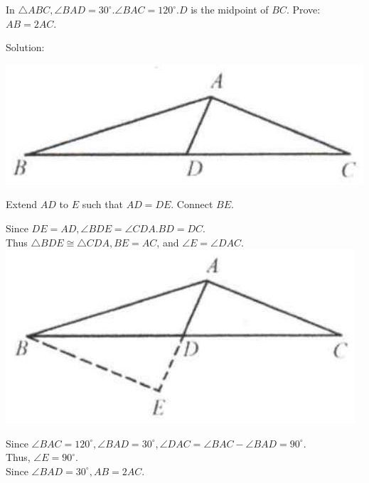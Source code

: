 \documentclass{article}
\begin{document}
In \(\triangle A B C, \angle B A D=30^{\circ} . \angle B A C=120^{\circ} . D\) is the midpoint of \(B C\). Prove: \(A B=2 A C\).

Solution:
\begin{center}
\includegraphics[width=\textwidth]{images/024(4).jpg}
\end{center}

Extend \(A D\) to \(E\) such that \(A D=D E\). Connect \(B E\).

Since \(D E=A D, \angle B D E=\angle C D A . B D=D C\).\\
Thus \(\triangle B D E \cong \triangle C D A, B E=A C\), and \(\angle E=\angle D A C\).\\
\centering
\includegraphics[width=\textwidth]{images/024.jpg}

Since \(\angle B A C=120^{\circ}, \angle B A D=30^{\circ}, \angle D A C=\angle B A C-\angle B A D=90^{\circ}\).\\
Thus, \(\angle E=90^{\circ}\).\\
Since \(\angle B A D=30^{\circ}, A B=2 A C\).
\end{document}

